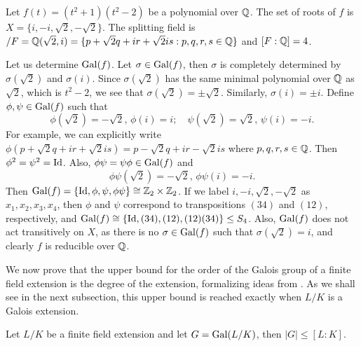\begin{example} \label{exm:galois-group}
	Let $f(t) = (t^2 + 1)(t^2 - 2)$ be a polynomial over $\mathbb Q$. The set of roots of $f$ is $X = \{i, -i, \sqrt 2, -\sqrt 2\}$. The splitting field is $/F = \mathbb Q(\sqrt 2, i) = \{p+\sqrt 2 q + i r + \sqrt 2 i s : p, q, r, s \in \mathbb Q\}$ and $[F : \mathbb Q] = 4$. 
	
	Let us determine $\operatorname{Gal}(f)$. Let $\sigma \in \operatorname{Gal}(f)$, then $\sigma$ is completely determined by $\sigma(\sqrt 2)$ and $\sigma(i)$. Since $\sigma(\sqrt 2)$ has the same minimal polynomial over $\mathbb Q$ as $\sqrt 2$, which is $t^2 - 2$, we see that $\sigma(\sqrt 2) = \pm \sqrt 2$. Similarly, $\sigma(i) = \pm i$. Define $\phi, \psi \in \operatorname{Gal}(f)$ such that 
	$$
		\phi(\sqrt 2) = -\sqrt 2, \, \phi(i) = i; \quad
		\psi(\sqrt 2) = \sqrt 2, \, \psi (i) = -i. 
	$$
	For example, we can explicitly write $\phi(p + \sqrt 2 q + i r + \sqrt 2 i s) = p - \sqrt 2 q + i r - \sqrt 2 i s$ where $p,q,r,s \in \mathbb Q$. Then $\phi ^ 2 = \psi ^ 2 = \operatorname{Id}$. Also, $\phi\psi  = \psi \phi \in \operatorname{Gal}(f)$ and $$\phi\psi(\sqrt 2) = -\sqrt 2, \, \phi\psi(i) = -i. $$
	Then $\operatorname{Gal}(f) = \{\operatorname{Id}, \phi, \psi, \phi \psi \} \cong \mathbb Z_2 \times \mathbb Z_2$. If we label $i, -i, \sqrt 2, -\sqrt 2$ as $x_1, x_2, x_3, x_4$, then $\phi$ and $\psi$ correspond to transpositions $(34)$ and $(12)$, respectively, and $\operatorname{Gal}(f) \cong \{\operatorname{Id}, (34), (12), (12)(34)\} \le S_4$. Also, $\operatorname{Gal}(f)$ does not act transitively on $X$, as there is no $\sigma \in \operatorname{Gal}(f)$ such that $\sigma(\sqrt 2) = i$, and clearly $f$ is reducible over $\mathbb Q$.
\end{example}

We now prove that the upper bound for the order of the Galois group of a finite field extension is the degree of the extension, formalizing ideas from  \cite{galois-theory-lectures}. As we shall see in the next subsection, this upper bound is reached exactly when $L/K$ is a Galois extension. 

\begin{theorem} \label{thm:galois-group-order-upper-bound}
	Let $L/K$ be a finite field extension and let $G = \operatorname{Gal}(L/K)$, then $|G| \le [L:K]$. 
\end{theorem}

